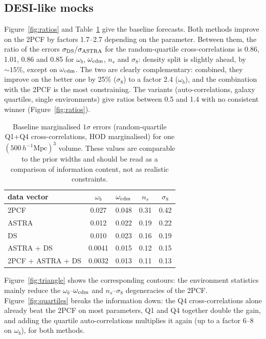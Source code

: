 \documentclass[11pt,twocolumn]{article}
\newcommand{\Mpch}{\,h^{-1}\mathrm{Mpc}}
\begin{document}
\subsection{DESI-like mocks}

Figure~\ref{fig:ratios} and Table~\ref{tab:sigma} give the baseline forecasts. Both methods improve on the 2PCF by factors 1.7--2.7 depending on the parameter. Between them, the ratio of the errors $\sigma_{\rm DS}/\sigma_{\rm ASTRA}$ for the random-quartile cross-correlations is 0.86, 1.01, 0.86 and 0.85 for $\omega_b$, $\omega_{\rm cdm}$, $n_s$ and $\sigma_8$: density split is slightly ahead, by $\sim15\%$, except on $\omega_{\rm cdm}$. The two are clearly complementary: combined, they improve on the better one by 25\% ($\sigma_8$) to a factor 2.4 ($\omega_b$), and the combination with the 2PCF is the most constraining. The variants (auto-correlations, galaxy quartiles, single environments) give ratios between 0.5 and 1.4 with no consistent winner (Figure~\ref{fig:ratios}).

\begin{table}[h]
\centering\small
\begin{tabular}{lcccc}
\toprule
data vector & $\omega_b$ & $\omega_{\rm cdm}$ & $n_s$ & $\sigma_8$ \\
\midrule
2PCF & 0.027 & 0.048 & 0.31 & 0.42 \\
ASTRA & 0.012 & 0.022 & 0.19 & 0.22 \\
DS & 0.010 & 0.023 & 0.16 & 0.19 \\
ASTRA + DS & 0.0041 & 0.015 & 0.12 & 0.15 \\
2PCF + ASTRA + DS & 0.0032 & 0.013 & 0.11 & 0.13 \\
\bottomrule
\end{tabular}
\caption{Baseline marginalised $1\sigma$ errors (random-quartile Q1+Q4 cross-correlations, HOD marginalised) for one $(500\Mpch)^3$ volume. These values are comparable to the prior widths and should be read as a comparison of information content, not as realistic constraints.}
\label{tab:sigma}
\end{table}

Figure~\ref{fig:triangle} shows the corresponding contours: the environment statistics mainly reduce the $\omega_b$--$\omega_{\rm cdm}$ and $n_s$--$\sigma_8$ degeneracies of the 2PCF. Figure~\ref{fig:quartiles} breaks the information down: the Q4 cross-correlations alone already beat the 2PCF on most parameters, Q1 and Q4 together double the gain, and adding the quartile auto-correlations multiplies it again (up to a factor 6--8 on $\omega_b$), for both methods.
\end{document}
